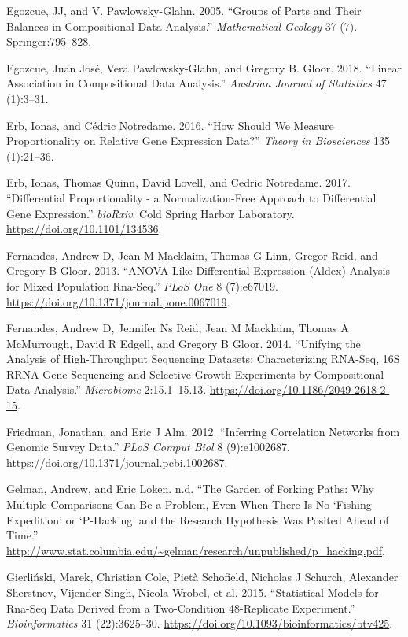 \documentclass[onecolumn]{book}
\theoremstyle{definition}
\theoremstyle{definition}
\theoremstyle{definition}
\theoremstyle{remark}
\begin{document}
\leavevmode\hypertarget{ref-egozcue2005}{}%
Egozcue, JJ, and V. Pawlowsky-Glahn. 2005. ``Groups of Parts and Their
Balances in Compositional Data Analysis.'' \emph{Mathematical Geology}
37 (7). Springer:795--828.

\leavevmode\hypertarget{ref-egozcue:AJS}{}%
Egozcue, Juan José, Vera Pawlowsky-Glahn, and Gregory B. Gloor. 2018.
``Linear Association in Compositional Data Analysis.'' \emph{Austrian
Journal of Statistics} 47 (1):3--31.

\leavevmode\hypertarget{ref-erb:2016}{}%
Erb, Ionas, and Cédric Notredame. 2016. ``How Should We Measure
Proportionality on Relative Gene Expression Data?'' \emph{Theory in
Biosciences} 135 (1):21--36.

\leavevmode\hypertarget{ref-Erb134536}{}%
Erb, Ionas, Thomas Quinn, David Lovell, and Cedric Notredame. 2017.
``Differential Proportionality - a Normalization-Free Approach to
Differential Gene Expression.'' \emph{bioRxiv}. Cold Spring Harbor
Laboratory. \url{https://doi.org/10.1101/134536}.

\leavevmode\hypertarget{ref-fernandes:2013}{}%
Fernandes, Andrew D, Jean M Macklaim, Thomas G Linn, Gregor Reid, and
Gregory B Gloor. 2013. ``ANOVA-Like Differential Expression (Aldex)
Analysis for Mixed Population Rna-Seq.'' \emph{PLoS One} 8 (7):e67019.
\url{https://doi.org/10.1371/journal.pone.0067019}.

\leavevmode\hypertarget{ref-fernandes:2014}{}%
Fernandes, Andrew D, Jennifer Ns Reid, Jean M Macklaim, Thomas A
McMurrough, David R Edgell, and Gregory B Gloor. 2014. ``Unifying the
Analysis of High-Throughput Sequencing Datasets: Characterizing RNA-Seq,
16S RRNA Gene Sequencing and Selective Growth Experiments by
Compositional Data Analysis.'' \emph{Microbiome} 2:15.1--15.13.
\url{https://doi.org/10.1186/2049-2618-2-15}.

\leavevmode\hypertarget{ref-Friedman:2012}{}%
Friedman, Jonathan, and Eric J Alm. 2012. ``Inferring Correlation
Networks from Genomic Survey Data.'' \emph{PLoS Comput Biol} 8
(9):e1002687. \url{https://doi.org/10.1371/journal.pcbi.1002687}.

\leavevmode\hypertarget{ref-forking:2013}{}%
Gelman, Andrew, and Eric Loken. n.d. ``The Garden of Forking Paths: Why
Multiple Comparisons Can Be a Problem, Even When There Is No `Fishing
Expedition' or `P-Hacking' and the Research Hypothesis Was Posited Ahead
of Time.''
\url{http://www.stat.columbia.edu/~gelman/research/unpublished/p_hacking.pdf}.

\leavevmode\hypertarget{ref-Gierlinski:2015aa}{}%
Gierliński, Marek, Christian Cole, Pietà Schofield, Nicholas J Schurch,
Alexander Sherstnev, Vijender Singh, Nicola Wrobel, et al. 2015.
``Statistical Models for Rna-Seq Data Derived from a Two-Condition
48-Replicate Experiment.'' \emph{Bioinformatics} 31 (22):3625--30.
\url{https://doi.org/10.1093/bioinformatics/btv425}.
\end{document}
